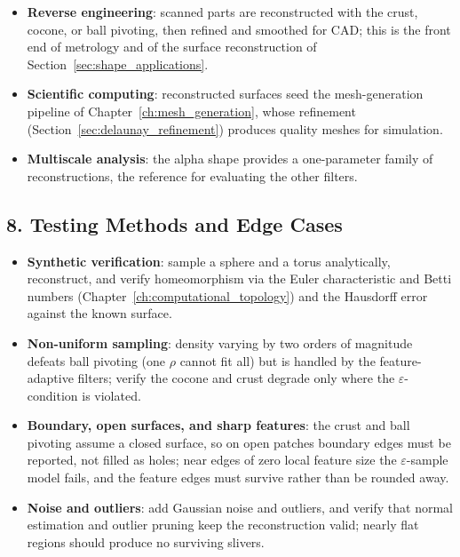 \begin{itemize}
  \item \textbf{Reverse engineering}: scanned parts are reconstructed with the
    crust, cocone, or ball pivoting, then refined and smoothed for CAD; this is
    the front end of metrology and of the surface reconstruction of
    Section~\ref{sec:shape_applications}.
  \item \textbf{Scientific computing}: reconstructed surfaces seed the
    mesh-generation pipeline of Chapter~\ref{ch:mesh_generation}, whose
    refinement (Section~\ref{sec:delaunay_refinement}) produces quality meshes
    for simulation.
  \item \textbf{Multiscale analysis}: the alpha shape provides a one-parameter
    family of reconstructions, the reference for evaluating the other filters.
\end{itemize}

\subsection{8. Testing Methods and Edge Cases}

\begin{itemize}
  \item \textbf{Synthetic verification}: sample a sphere and a torus
    analytically, reconstruct, and verify homeomorphism via the Euler
    characteristic and Betti numbers (Chapter~\ref{ch:computational_topology})
    and the Hausdorff error against the known surface.
  \item \textbf{Non-uniform sampling}: density varying by two orders of
    magnitude defeats ball pivoting (one $\rho$ cannot fit all) but is handled
    by the feature-adaptive filters; verify the cocone and crust degrade only
    where the $\varepsilon$-condition is violated.
  \item \textbf{Boundary, open surfaces, and sharp features}: the crust and
    ball pivoting assume a closed surface, so on open patches boundary edges
    must be reported, not filled as holes; near edges of zero local feature
    size the $\varepsilon$-sample model fails, and the feature edges must
    survive rather than be rounded away.
  \item \textbf{Noise and outliers}: add Gaussian noise and outliers, and
    verify that normal estimation and outlier pruning keep the reconstruction
    valid; nearly flat regions should produce no surviving slivers.
\end{itemize}

